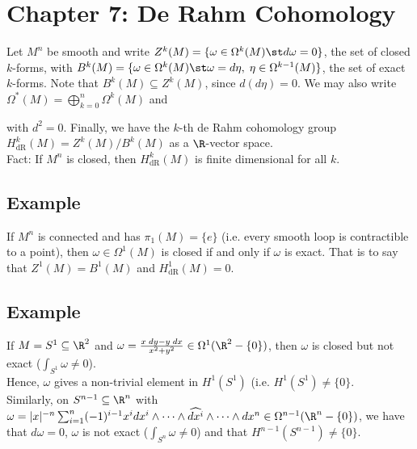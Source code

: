 \documentclass[11pt]{article}
\begin{document}
\section*{Chapter 7: De Rahm Cohomology}
\label{sec:org2bc26d6}
Let \(M^{n}\) be smooth and write \(Z^{k}(M)=\{\omega\in\Omega^{k}(M)\st d\omega=0\}\), the set of closed \(k\)-forms, with \(B^{k}(M)=\{\omega\in\Omega^{k}(M)\st\omega=d\eta,\;\eta\in\Omega^{k-1}(M)\}\), the set of exact \(k\)-forms. Note that \(B^{k}(M)\subseteq Z^{k}(M)\), since \(d(d\eta)=0\). We may also write \(\Omega^{*}(M)=\bigoplus_{k=0}^{n}\Omega^{k}(M)\) and\\
with \(d^{2}=0\). Finally, we have the \(k\)-th de Rahm cohomology group \(H^{k}_{\text{dR}}(M)=Z^{k}(M)/B^{k}(M)\) as a \(\R\)-vector space.\\
Fact: If \(M^{n}\) is closed, then \(H^{k}_{\text{dR}}(M)\) is finite dimensional for all \(k\).\\
\subsection*{Example}
\label{sec:org91af072}
If \(M^{n}\) is connected and has \(\pi_{1}(M)=\{e\}\) (i.e. every smooth loop is contractible to a point), then \(\omega\in\Omega^{1}(M)\) is closed if and only if \(\omega\) is exact. That is to say that \(Z^{1}(M)=B^{1}(M)\) and \(H^{1}_{\text{dR}}(M)=0\).\\
\subsection*{Example}
\label{sec:org1ee1c99}
If \(M=S^{1}\subseteq\R^{2}\) and \(\omega=\frac{x\;dy-y\;dx}{x^{2}+y^{2}}\in\Omega^{1}(\R^{2}-\{0\})\), then \(\omega\) is closed but not exact (\(\int_{S^{1}}\omega\neq0\)).\\
Hence, \(\omega\) gives a non-trivial element in \(H^{1}(S^{1})\) (i.e. \(H^{1}(S^{1})\neq\{0\}\).\\
Similarly, on \(S^{n-1}\subseteq\R^{n}\) with \(\omega=|x|^{-n}\sum_{i=1}^{n}(-1)^{i-1}x^{i}dx^{i}\wedge\cdots\wedge\widehat{dx^{i}}\wedge\cdots\wedge dx^{n}\in\Omega^{n-1}(\R^{n}-\{0\})\), we have that \(d\omega=0\), \(\omega\) is not exact (\(\int_{S^{n}}\omega\neq0\)) and that \(H^{n-1}(S^{n-1})\neq\{0\}\).\\
\end{document}
